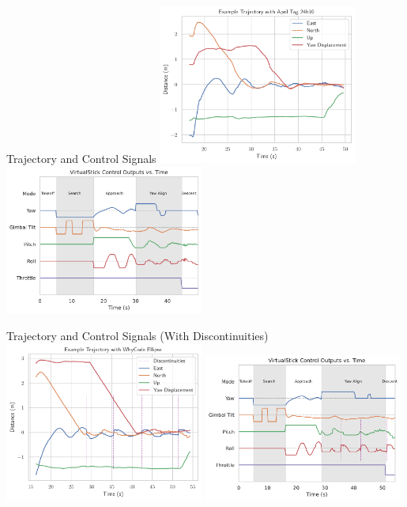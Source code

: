 \documentclass[aspectratio=169]{beamer}
\begin{document}
\begin{frame}{Trajectory and Control Signals}
    \centering
    \includegraphics[width=0.49\textwidth]{./images/landing_trajectory}
    \includegraphics[width=0.49\textwidth]{./images/control_example}
\end{frame}

\begin{frame}{Trajectory and Control Signals (With Discontinuities)}
    \centering
    \includegraphics[width=0.49\textwidth]{./images/landing_trajectory_with_discontinuities}
    \includegraphics[width=0.49\textwidth]{./images/control_example_with_discontinuities}
\end{frame}
\end{document}
